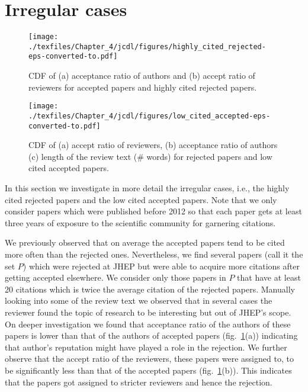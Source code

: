\noindent
\section{Irregular cases}

\begin{figure}
\centering
\texttt{[image: ./texfiles/Chapter\_4/jcdl/figures/highly\_cited\_rejected-eps-converted-to.pdf]}
\caption{CDF of (a) acceptance ratio of authors and (b) accept ratio of reviewers for accepted papers and highly cited rejected papers.}
\label{fig10}
\end{figure}

\begin{figure}
\centering
\texttt{[image: ./texfiles/Chapter\_4/jcdl/figures/low\_cited\_accepted-eps-converted-to.pdf]}
\caption{CDF of (a) accept ratio of reviewers, (b) acceptance ratio of authors (c) length of the review text (\# words) for rejected papers and low cited accepted papers.}
\label{fig11}
\end{figure}



\label{irregular_cases}

In this section we investigate in more detail the irregular cases, i.e., the highly cited rejected papers and the low cited accepted papers. Note that we only consider papers which were published before 2012 so that each paper gets at least three years of exposure to the scientific community for garnering citations.

 We previously observed that on average the accepted papers tend to be cited more often than the rejected ones. Nevertheless, we find several papers (call it the set $P$) which were rejected at JHEP but were able to acquire more citations after getting accepted elsewhere. We consider only those papers in $P$ that have at least 20 citations which is twice the average citation of the rejected papers.
Manually looking into some of the review text we observed that in several cases the reviewer found the topic of research to be interesting but out of JHEP's scope. On deeper investigation we found that acceptance ratio of the authors of these papers is lower than that of the authors of accepted papers (fig.~\ref{fig10}(a)) indicating that author's reputation might have played a role in the rejection. We further observe that the accept ratio of the reviewers, these papers were assigned to, to be significantly less than that of the accepted papers (fig.~\ref{fig10}(b)). This indicates that the papers got assigned to stricter reviewers and hence the rejection.


